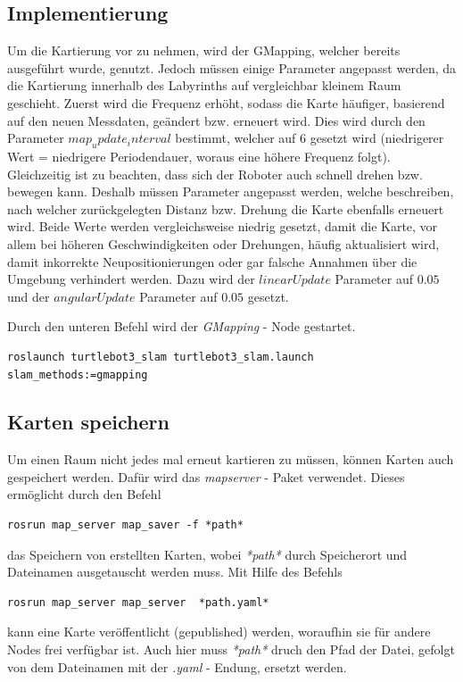 {	\subsection{Implementierung}
	{
		Um die Kartierung vor zu nehmen, wird der GMapping, welcher bereits ausgeführt wurde, genutzt. Jedoch müssen einige Parameter angepasst werden, da die Kartierung innerhalb des Labyrinths auf vergleichbar kleinem Raum geschieht. Zuerst wird die Frequenz erhöht, sodass die Karte häufiger, basierend auf den neuen Messdaten, geändert bzw. erneuert wird. Dies wird durch den Parameter $map_update_interval$ bestimmt, welcher auf $6$ gesetzt wird (niedrigerer Wert = niedrigere Periodendauer, woraus eine höhere Frequenz folgt). Gleichzeitig ist zu beachten, dass sich der Roboter auch schnell drehen bzw. bewegen kann. Deshalb müssen Parameter angepasst werden, welche beschreiben, nach welcher zurückgelegten Distanz bzw. Drehung die Karte ebenfalls erneuert wird. Beide Werte werden vergleichsweise niedrig gesetzt, damit die Karte, vor allem bei höheren Geschwindigkeiten oder Drehungen, häufig aktualisiert wird, damit inkorrekte Neupositionierungen oder gar falsche Annahmen über die Umgebung verhindert werden. Dazu wird der $linearUpdate$ Parameter auf $0.05$ und der $angularUpdate$ Parameter auf $0.05$ gesetzt.
		
		Durch den unteren Befehl wird der \emph{GMapping} - Node gestartet.
		\begin{lstlisting}
roslaunch turtlebot3_slam turtlebot3_slam.launch slam_methods:=gmapping
		\end{lstlisting}

	}	

	\subsection{Karten speichern}
	{
		Um einen Raum nicht jedes mal erneut kartieren zu müssen, können Karten auch gespeichert werden. Dafür wird das \emph{map\tus server} - Paket verwendet. Dieses ermöglicht durch den Befehl 
		\begin{lstlisting}
rosrun map_server map_saver -f *path*
		\end{lstlisting}
	das Speichern von erstellten Karten, wobei \emph{*path*} durch Speicherort und Dateinamen ausgetauscht werden muss. Mit Hilfe des Befehls
		\begin{lstlisting}
rosrun map_server map_server  *path.yaml*
		\end{lstlisting}
	kann eine Karte veröffentlicht (gepublished) werden, woraufhin sie für andere Nodes frei verfügbar ist. Auch hier muss \emph{*path*} druch den Pfad der Datei, gefolgt von dem Dateinamen mit der \emph{.yaml} - Endung, ersetzt werden.
	}
}